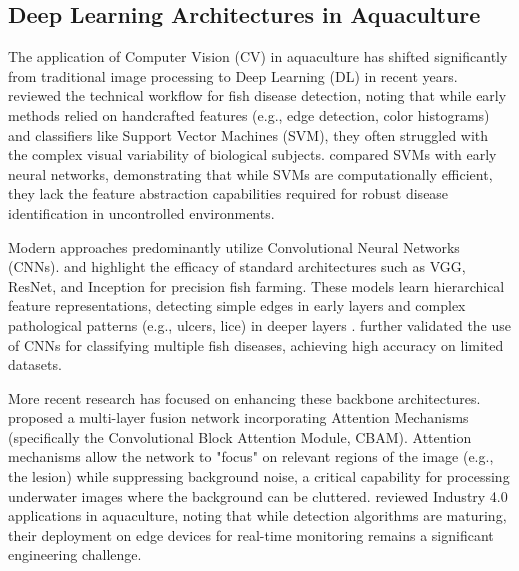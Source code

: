 \documentclass[12pt,a4paper]{article}
\begin{document}
\subsection{Deep Learning Architectures in Aquaculture}
The application of Computer Vision (CV) in aquaculture has shifted significantly from traditional image processing to Deep Learning (DL) in recent years. \cite{Pauzi_2021} reviewed the technical workflow for fish disease detection, noting that while early methods relied on handcrafted features (e.g., edge detection, color histograms) and classifiers like Support Vector Machines (SVM), they often struggled with the complex visual variability of biological subjects. \cite{AHMED20225170} compared SVMs with early neural networks, demonstrating that while SVMs are computationally efficient, they lack the feature abstraction capabilities required for robust disease identification in uncontrolled environments.

Modern approaches predominantly utilize Convolutional Neural Networks (CNNs). \cite{HaddadMohammed2025} and \cite{AlZubi2024} highlight the efficacy of standard architectures such as VGG, ResNet, and Inception for precision fish farming. These models learn hierarchical feature representations, detecting simple edges in early layers and complex pathological patterns (e.g., ulcers, lice) in deeper layers \citep{CHEN2025109507}. \cite{Hasan2022} further validated the use of CNNs for classifying multiple fish diseases, achieving high accuracy on limited datasets.

More recent research has focused on enhancing these backbone architectures. \cite{10138194} proposed a multi-layer fusion network incorporating Attention Mechanisms (specifically the Convolutional Block Attention Module, CBAM). Attention mechanisms allow the network to "focus" on relevant regions of the image (e.g., the lesion) while suppressing background noise, a critical capability for processing underwater images where the background can be cluttered. \cite{BIAZI2023102360} reviewed Industry 4.0 applications in aquaculture, noting that while detection algorithms are maturing, their deployment on edge devices for real-time monitoring remains a significant engineering challenge.
\end{document}

